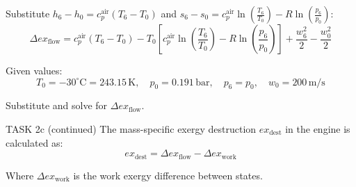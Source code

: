 Substitute \( h_6 - h_0 = c_p^{\text{air}} (T_6 - T_0) \) and \( s_6 - s_0 = c_p^{\text{air}} \ln \left( \frac{T_6}{T_0} \right) - R \ln \left( \frac{p_6}{p_0} \right) \):  
\[
\Delta ex_{\text{flow}} = c_p^{\text{air}} (T_6 - T_0) - T_0 \left[ c_p^{\text{air}} \ln \left( \frac{T_6}{T_0} \right) - R \ln \left( \frac{p_6}{p_0} \right) \right] + \frac{w_6^2}{2} - \frac{w_0^2}{2}
\]  

Given values:  
\[
T_0 = -30^\circ\text{C} = 243.15 \, \text{K}, \quad p_0 = 0.191 \, \text{bar}, \quad p_6 = p_0, \quad w_0 = 200 \, \text{m/s}
\]  

Substitute and solve for \( \Delta ex_{\text{flow}} \).  

TASK 2c (continued)  
The mass-specific exergy destruction \( ex_{\text{dest}} \) in the engine is calculated as:  
\[
ex_{\text{dest}} = \Delta ex_{\text{flow}} - \Delta ex_{\text{work}}
\]  

Where \( \Delta ex_{\text{work}} \) is the work exergy difference between states.